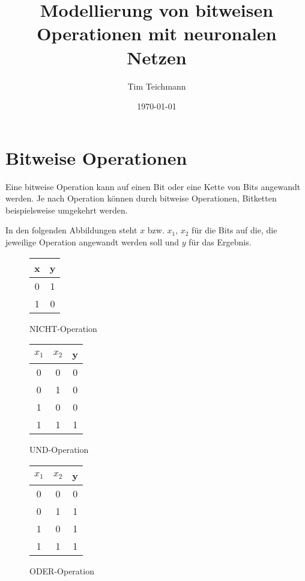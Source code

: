 \documentclass[a4paper]{report}
\title{\textbf{Modellierung von bitweisen Operationen mit neuronalen Netzen}}
\author{Tim Teichmann}
\date{\today}
\begin{document}
\maketitle
\tableofcontents

\chapter{Bitweise Operationen}
Eine bitweise Operation kann auf einen Bit oder eine Kette von Bits angewandt werden.
Je nach Operation können durch bitweise Operationen, Bitketten beispielsweise umgekehrt werden.

In den folgenden Abbildungen steht $x$ bzw. $x_1$, $x_2$ für die Bits auf die, die jeweilige Operation angewandt werden soll und $y$ für das Ergebnis.

\begin{figure}[ht]
    \centering
    \begin{tabular}{|c|c|}
        \hline
        x & y \\
        \hline
        0 & 1 \\
        \hline
        1 & 0 \\
        \hline
    \end{tabular}
    \caption{NICHT-Operation}
\end{figure}

\begin{figure}[ht]
    \centering
    \begin{tabular}{|c|c|c|}
        \hline
        $x_1$ & $x_2$ & y \\
        \hline
        0 & 0 & 0 \\
        \hline
        0 & 1 & 0 \\
        \hline
        1 & 0 & 0 \\
        \hline
        1 & 1 & 1 \\
        \hline
    \end{tabular}
    \caption{UND-Operation}
\end{figure}

\begin{figure}[ht]
    \centering
    \begin{tabular}{|c|c|c|}
        \hline
        $x_1$ & $x_2$ & y \\
        \hline
        0 & 0 & 0 \\
        \hline
        0 & 1 & 1 \\
        \hline
        1 & 0 & 1 \\
        \hline
        1 & 1 & 1 \\
        \hline
    \end{tabular}
    \caption{ODER-Operation}
    \label{fig:or}
\end{figure}
\end{document}
